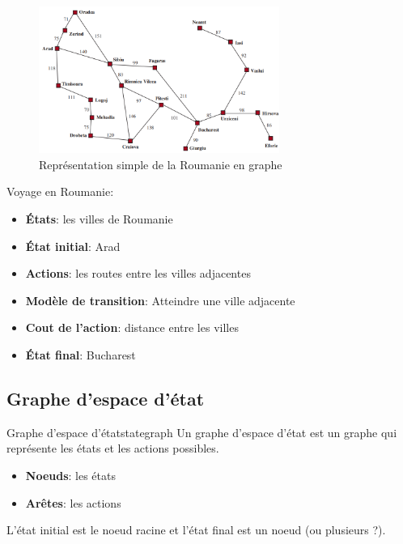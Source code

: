 \documentclass[a4paper, 12pt]{extarticle}
\begin{document}
\begin{figure}[H]
    \begin{center}
        \includegraphics[width=0.70\textwidth]{./pictures/roumanie.png}
    \end{center}
    \caption{Représentation simple de la Roumanie en graphe}\label{fig:romania}
\end{figure}



\begin{example}\leavevmode
    Voyage en Roumanie:
    \begin{itemize}
        \item \textbf{États}: les villes de Roumanie
        \item \textbf{État initial}: Arad
        \item \textbf{Actions}: les routes entre les villes adjacentes
        \item \textbf{Modèle de transition}: Atteindre une ville adjacente
        \item \textbf{Cout de l'action}: distance entre les villes
        \item \textbf{État final}: Bucharest 
    \end{itemize}
\end{example}


\subsection{Graphe d'espace d'état} %
\label{sub:graphe_d_espace_d_etat}

\begin{definition}{Graphe d'espace d'état}{stategraph}
    Un graphe d'espace d'état est un graphe qui représente les états et les actions possibles.
    \begin{itemize}
        \item \textbf{Noeuds}: les états
        \item \textbf{Arêtes}: les actions
    \end{itemize} 
    L'état initial est le noeud racine et l'état final est un noeud (ou plusieurs ?).
\end{definition}
\end{document}
